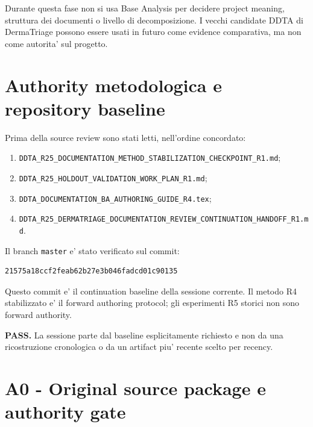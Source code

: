 \documentclass[11pt,a4paper]{article}
\begin{document}
\begin{ddtaanti}[title={Anti-contamination rule}]
Durante questa fase non si usa Base Analysis per decidere project meaning, struttura dei documenti o livello di decomposizione. I vecchi candidate DDTA di DermaTriage possono essere usati in futuro come evidence comparativa, ma non come autorita' sul progetto.
\end{ddtaanti}

\section{Authority metodologica e repository baseline}

Prima della source review sono stati letti, nell'ordine concordato:
\begin{enumerate}
  \item \texttt{DDTA\_R25\_DOCUMENTATION\_METHOD\_STABILIZATION\_CHECKPOINT\_R1.md};
  \item \texttt{DDTA\_R25\_HOLDOUT\_VALIDATION\_WORK\_PLAN\_R1.md};
  \item \texttt{DDTA\_DOCUMENTATION\_BA\_AUTHORING\_GUIDE\_R4.tex};
  \item \texttt{DDTA\_R25\_DERMATRIAGE\_DOCUMENTATION\_REVIEW\_CONTINUATION\_HANDOFF\_R1.md}.
\end{enumerate}

Il branch \texttt{master} e' stato verificato sul commit:
\begin{lstlisting}
21575a18ccf2feab62b27e3b046fadcd01c90135
\end{lstlisting}

Questo commit e' il continuation baseline della sessione corrente. Il metodo R4 stabilizzato e' il forward authoring protocol; gli esperimenti R5 storici non sono forward authority.

\begin{ddtacheck}[title={Repository authority gate}]
\textbf{PASS.} La sessione parte dal baseline esplicitamente richiesto e non da una ricostruzione cronologica o da un artifact piu' recente scelto per recency.
\end{ddtacheck}

\section{A0 - Original source package e authority gate}
\end{document}

